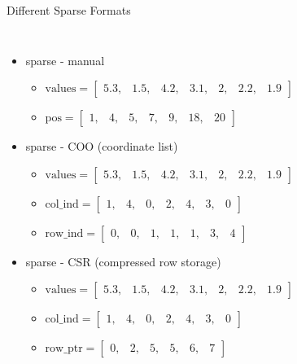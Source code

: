 \documentclass[aspectratio=169,xcolor=dvipsnames]{beamer}
\begin{document}
\begin{frame}{Different Sparse Formats}
    \begin{columns}[c] %

\begin{itemize}
\item sparse - manual
  \begin{itemize}
     	\item $\mathrm{values} =  \begin{bmatrix} 
		5.3, & 1.5, & 4.2, & 3.1, & 2, & 2.2, & 1.9 
		\end{bmatrix}$

		\item $\mathrm{pos} = \begin{bmatrix}
		1, & 4, & 5, & 7, & 9, & 18, & 20 
		\end{bmatrix}$
	\end{itemize}
\item sparse - COO (coordinate list)
	\begin{itemize}
		\item $\mathrm{values} = \begin{bmatrix}
		5.3, & 1.5, & 4.2, & 3.1, & 2, & 2.2, & 1.9 
		\end{bmatrix}$
		\item $\mathrm{col\_ind} = \begin{bmatrix}
		1, & 4, & 0, & 2, & 4, & 3, & 0 
		\end{bmatrix}$
		\item $\mathrm{row\_ind} = \begin{bmatrix}
		0, & 0, & 1, & 1, & 1, & 3, & 4 
		\end{bmatrix}$
	\end{itemize}
\item sparse - CSR (compressed row storage)
	\begin{itemize}
       \item $\mathrm{values} = \begin{bmatrix}
		5.3, & 1.5, & 4.2, & 3.1, & 2, & 2.2, & 1.9 
		\end{bmatrix}$
		\item $\mathrm{col\_ind} = \begin{bmatrix}
		1, & 4, & 0, & 2, & 4, & 3, & 0 
		\end{bmatrix}$
		\item $\mathrm{row\_ptr} = \begin{bmatrix}
		0, & 2, & 5, & 5, & 6, & 7 
		\end{bmatrix}$
	\end{itemize}
\end{itemize}
        

\end{columns}
\end{frame}
\end{document}
